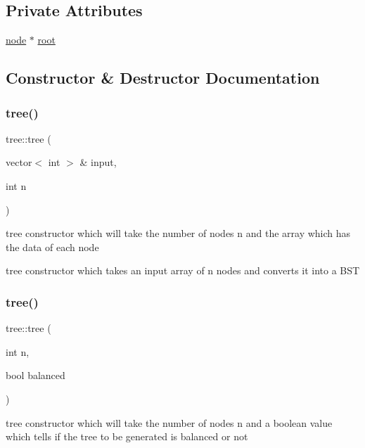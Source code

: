 \subsection*{Private Attributes}
\begin{DoxyCompactItemize}
\item 
\hyperlink{structnode}{node} $\ast$ \hyperlink{classtree_ad397d4906e47149b98f769b3e81473ee}{root}
\end{DoxyCompactItemize}


\subsection{Constructor \& Destructor Documentation}
\mbox{\label{classtree_a943d10650f183701ae0414689c9b9ee8}} 
\subsubsection{\texorpdfstring{tree()}{tree()}\hspace{0.1cm}{\footnotesize\ttfamily [1/2]}}
{\footnotesize\ttfamily tree\+::tree (\begin{DoxyParamCaption}\item[{vector$<$ int $>$ \&}]{input,  }\item[{int}]{n }\end{DoxyParamCaption})}

tree constructor which will take the number of nodes n and the array which has the data of each node

tree constructor which takes an input array of n nodes and converts it into a B\+ST \mbox{\label{classtree_a529a530e3787fdaee02ed65cbf1f17ff}} 
\subsubsection{\texorpdfstring{tree()}{tree()}\hspace{0.1cm}{\footnotesize\ttfamily [2/2]}}
{\footnotesize\ttfamily tree\+::tree (\begin{DoxyParamCaption}\item[{int}]{n,  }\item[{bool}]{balanced }\end{DoxyParamCaption})}

tree constructor which will take the number of nodes n and a boolean value which tells if the tree to be generated is balanced or not

